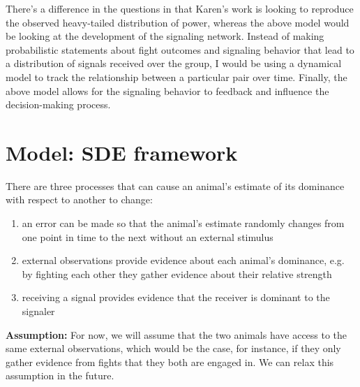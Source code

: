 \documentclass{article}
\begin{document}
There's a difference in the questions in that Karen's work is looking to reproduce the observed heavy-tailed distribution of power, whereas the above model would be looking at the development of the signaling network.  Instead of making probabilistic statements about fight outcomes and signaling behavior that lead to a distribution of signals received over the group, I would be using a dynamical model to track the relationship between a particular pair over time.  Finally, the above model allows for the signaling behavior to feedback and influence the decision-making process.

\section{Model: SDE framework}
There are three processes that can cause an animal's estimate of its dominance with respect to another to change:
\begin{enumerate}
\item an error can be made so that the animal's estimate randomly changes from one point in time to the next without an external stimulus

\item external observations provide evidence about each animal's dominance, e.g. by fighting each other they gather evidence about their relative strength

\item receiving a signal provides evidence that the receiver is dominant to the signaler

\end{enumerate}
{\bf Assumption:} For now, we will assume that the two animals have access to the same external observations, which would be the case, for instance, if they only gather evidence from fights that they both are engaged in.  We can relax this assumption in the future.
\end{document}
